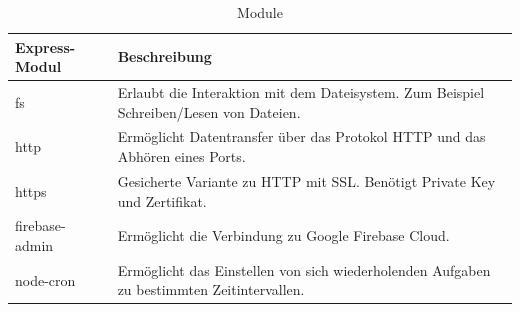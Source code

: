 \begin{table}[h]
\begin{center}
    \begin{tabular}{| l | p{8cm} |}
    \hline
    Express-Modul & Beschreibung \\ \hline
    fs & Erlaubt die Interaktion mit dem Dateisystem.\newline
	Zum Beispiel Schreiben/Lesen von Dateien.\\
    
    \hline
    http & Ermöglicht Datentransfer über das Protokol HTTP und das Abhören eines Ports.  \\
    
    \hline
	https & Gesicherte Variante zu HTTP mit SSL.\newline
	Benötigt Private Key und Zertifikat.  \\
	
    \hline    
    firebase-admin & Ermöglicht die Verbindung zu Google Firebase 			Cloud. \\ 
    
    \hline    
    node-cron & Ermöglicht das Einstellen von sich wiederholenden 			Aufgaben zu bestimmten Zeitintervallen.  \\
    \hline
    \end{tabular}
\end{center}
\caption{Module}
\end{table}
